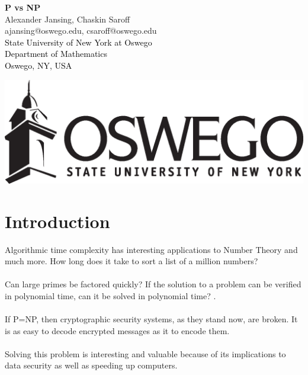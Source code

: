 \documentclass[14pt]{article}
\newcommand{\Black}{\textcolor{Black}}
\theoremstyle{definition}
\theoremstyle{definition}
\begin{document}
\begin{center}
\Large \textbf{P vs NP} \normalsize \\
Alexander Jansing, Chaskin Saroff\\
ajansing@oswego.edu, csaroff@oswego.edu\\
\Black{ \hspace{0 in} State University of New York at Oswego\\ \hspace{0 in} Department of Mathematics\hspace{3.1 in}
\\Oswego, NY, USA\\}
\end{center}
\vspace*{.5 cm}
\includegraphics[scale=.75]{oswego_logo_horiz_blk}
\vspace*{.5 cm}



\section*{Introduction}
Algorithmic time complexity has interesting applications to Number Theory and much more.  How long does it take to sort a list of a million numbers?  
\\
\\
Can  large primes be factored quickly?  If the solution to a problem can be verified in polynomial time, can it be solved in polynomial time?  \cite{CD}.
\\
\\
If P=NP, then cryptographic security systems, as they stand now, are broken.  It is as easy to decode encrypted messages as it to encode them.
\\
\\
Solving this problem is interesting and valuable because of its implications to data security as well as speeding up computers.
\\
\\
\end{document}
